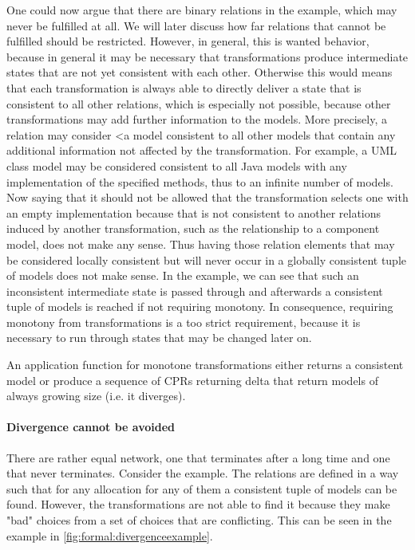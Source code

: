 One could now argue that there are binary relations in the example, which may never be fulfilled at all. We will later discuss how far relations that cannot be fulfilled should be restricted. However, in general, this is wanted behavior, because in general it may be necessary that transformations produce intermediate states that are not yet consistent with each other. Otherwise this would means that each transformation is always able to directly deliver a state that is consistent to all other relations, which is especially not possible, because other transformations may add further information to the models. More precisely, a relation may consider <a model consistent to all other models that contain any additional information not affected by the transformation. For example, a UML class model may be considered consistent to all Java models with any implementation of the specified methods, thus to an infinite number of models. Now saying that it should not be allowed that the transformation selects one with an empty implementation because that is not consistent to another relations induced by another transformation, such as the relationship to a component model, does not make any sense. Thus having those relation elements that may be considered locally consistent but will never occur in a globally consistent tuple of models does not make sense.
In the example, we can see that such an inconsistent intermediate state is passed through and afterwards a consistent tuple of models is reached if not requiring monotony.
In consequence, requiring monotony from transformations is a too strict requirement, because it is necessary to run through states that may be changed later on.

\begin{theorem}
    An application function for monotone transformations either returns a consistent model or produce a sequence of CPRs returning delta that return models of always growing size (i.e. it diverges).
\end{theorem}


\paragraph{Divergence cannot be avoided}

There are rather equal network, one that terminates after a long time and one that never terminates. 
Consider the example. The relations are defined in a way such that for any allocation for any of them a consistent tuple of models can be found. However, the transformations are not able to find it because they make "bad" choices from a set of choices that are conflicting. 
This can be seen in the example in \autoref{fig:formal:divergenceexample}.

